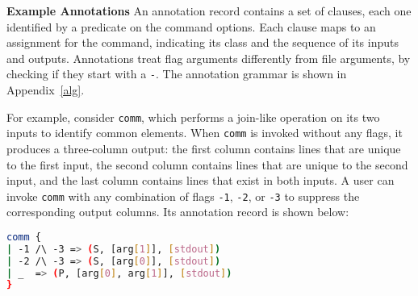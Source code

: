\documentclass[letterpaper,twocolumn,10pt]{article}
\newcommand{\heading}[1]{\vspace{4pt}\noindent\textbf{#1}\enspace}
\newcommand{\ttt}[1]{\texttt{#1}}
\newcommand{\cn}[1]{\mbox{\textcircled{\footnotesize #1}}}
\newcommand{\sta}{\cn{\textsc{S}}\xspace}
\newcommand{\pur}{\cn{\textsc{P}}\xspace}
\newcommand{\nv}[1]{[{\color{cyan}nv: #1}]}
\begin{document}



\heading{Example Annotations}
An annotation record contains a set of clauses, each one identified by a predicate on the command options.
Each clause maps to an assignment for the command, indicating its class and the sequence of its inputs and outputs.
Annotations treat flag arguments differently from file arguments, by checking if they start with a \ttt{-}.
The annotation grammar is shown in Appendix~\ref{alg}.

For example, consider \ttt{comm}, which performs a join-like operation on its two inputs to identify common elements.
When \ttt{comm} is invoked without any flags, it produces a three-column output:
  the first column contains lines that are unique to the first input, the second column contains lines that are unique to the second input, and the last column contains lines that exist in both inputs.
A user can invoke \ttt{comm} with any combination of flags \ttt{-1}, \ttt{-2}, or \ttt{-3} to suppress the corresponding output columns.
Its annotation record is shown below:
%
\begin{lstlisting}[language=sh, numbers=none]
comm {
| -1 /\ -3 => (S, [arg[1]], [stdout])
| -2 /\ -3 => (S, [arg[0]], [stdout])
| _  => (P, [arg[0], arg[1]], [stdout])
}
\end{lstlisting}
\end{document}

